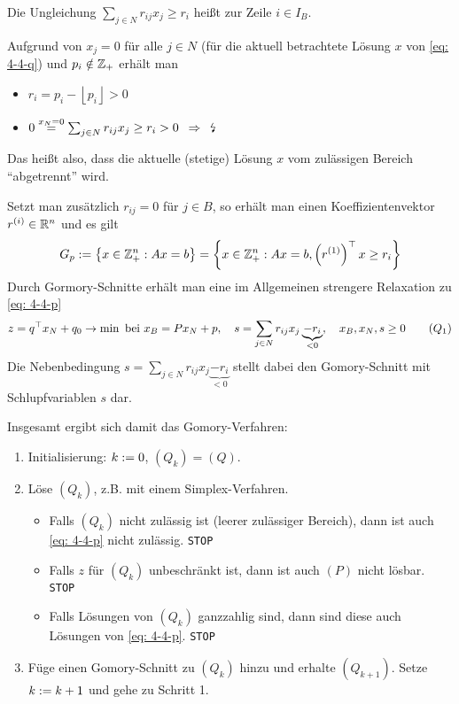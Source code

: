 \begin{definition}
	Die Ungleichung $\sum_{j \in N} r_{ij} x_j \ge r_i$ heißt  zur Zeile $i \in I_B$.
\end{definition}

Aufgrund von $x_j = 0$ für alle $j \in N$ (für die aktuell betrachtete Lösung $x$ von \eqref{eq: 4-4-q}) und $p_i \notin \mathbb{Z}_+$ erhält man
\begin{itemize}
	\item $r_i = p_i - \left\lfloor p_i \right\rfloor > 0$
	\item $0 \overset{x_N = 0}{=} \sum_{j \in N} r_{ij} x_j \ge r_i > 0 \enskip \Rightarrow \enskip \text{\lightning}$
\end{itemize}
Das heißt also, dass die aktuelle (stetige) Lösung $x$ vom zulässigen Bereich \enquote{abgetrennt} wird.

Setzt man zusätzlich $r_{ij} = 0$ für $j \in B$, so erhält man einen Koeffizientenvektor $r^{(i)} \in \mathbb{R}^n$ und es gilt
\begin{equation*}
	G_p \mathrel{:=} \left\{ x \in \mathbb{Z}_+^n: Ax = b \right\} = \left\{ x \in \mathbb{Z}_+^n: Ax = b, \left( r^{(1)} \right)^{\top} x \ge r_i \right\}
\end{equation*}
Durch Gormory-Schnitte erhält man eine im Allgemeinen strengere Relaxation zu \eqref{eq: 4-4-p}
\begin{equation*}
	z = q^{\top} x_N + q_0 \to \min \text{ bei } x_B = Px_ N + p, \quad s = \sum_{j \in N} r_{ij} x_j \underbrace{- r_i}_{< 0}, \quad x_B, x_N, s \ge 0
	\tag{$Q_1$} \label{eq: 4-4-q1}
\end{equation*}
Die Nebenbedingung $s = \sum_{j \in N} r_{ij} x_j \underbrace{- r_i}_{< 0}$ stellt dabei den Gomory-Schnitt mit Schlupfvariablen $s$ dar.

Insgesamt ergibt sich damit das Gomory-Verfahren:
\begin{enumerate}[label=Schritt \arabic*:, nolistsep, leftmargin=*, start=0]
	\item Initialisierung: $k \mathrel{:=} 0$, $(Q_k) = (Q)$.
	\item Löse $(Q_k)$, z.B. mit einem Simplex-Verfahren. 
	\begin{itemize}
		\item Falls $(Q_k)$ nicht zulässig ist (leerer zulässiger Bereich), dann ist auch \eqref{eq: 4-4-p} nicht zulässig. \texttt{STOP}
		\item Falls $z$ für $(Q_k)$ unbeschränkt ist, dann ist auch $(P)$ nicht lösbar. \texttt{STOP}
		\item Falls Lösungen von $(Q_k)$ ganzzahlig sind, dann sind diese auch Lösungen von \eqref{eq: 4-4-p}. \texttt{STOP}
	\end{itemize}
	\item Füge einen Gomory-Schnitt zu $(Q_k)$ hinzu und erhalte $(Q_{k+1})$. Setze $k \mathrel{:=} k+1$ und gehe zu Schritt 1.
\end{enumerate}

